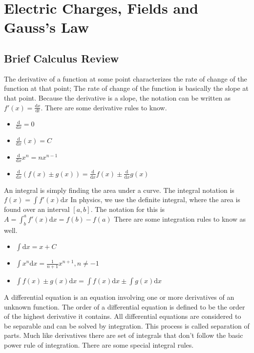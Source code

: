 \documentclass[../em.tex]{subfiles}
\begin{document}
\chapter{Electric Charges, Fields and Gauss's Law}
\section*{Brief Calculus Review}
The derivative of a function at some point characterizes the rate of change of the function at that point; The rate of change of the function is basically the slope at that point.
\smallbreak
Because the derivative is a slope, the notation can be written as $f'(x)=\frac{\mathrm{d}x}{\mathrm{d}t}$.
\smallbreak
There are some derivative rules to know.
\begin{itemize}
    \item $\frac{\mathrm{d}}{\mathrm{d}x} = 0$
    \item $\frac{\mathrm{d}}{\mathrm{d}x}(x) = C$
    \item $\frac{\mathrm{d}}{\mathrm{d}x}x^n = nx^{n-1}$
    \item $\frac{\mathrm{d}}{\mathrm{d}x}(f(x)\pm g(x))=\frac{\mathrm{d}}{\mathrm{d}x}f(x)\pm \frac{\mathrm{d}}{\mathrm{d}x}g(x)$
\end{itemize}
An integral is simply finding the area under a curve. 
\smallbreak
The integral notation is $f(x)=\int{f'(x)\mathrm{d}x}$
\smallbreak
In physics, we use the definite integral, where the area is found over an interval $[a,b]$.
\smallbreak
The notation for this is $A = \int_b^a{f'(x)\mathrm{d}x}=f(b)-f(a)$
\smallbreak
There are some integration rules to know as well.
\begin{itemize}
    \item $\int{\mathrm{d}x} = x+C$
    \item $\int{x^n\mathrm{d}x}=\frac{1}{n+1}x^{n+1}, n \neq -1$
    \item $\int{f(x)\pm g(x)\mathrm{d}x}=\int{f(x)\mathrm{d}x}\pm \int{g(x)\mathrm{d}x}$
\end{itemize}
A differential equation is an equation involving one or more derivatives of an unknown function. The order of a differential equation is defined to be the order of the highest derivative it contains.
\smallbreak
All differential equations are considered to be separable and can be solved by integration. This process is called separation of parts.
\smallbreak
Much like derivatives there are set of integrals that don't follow the basic power rule of integration. There are some special integral rules.
\end{document}
